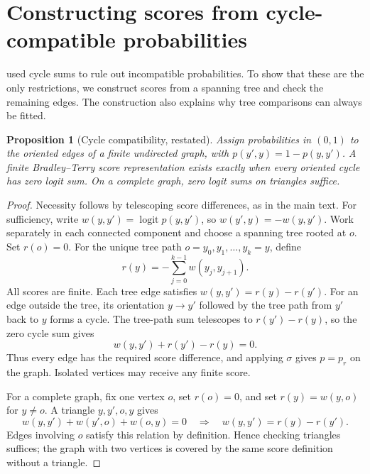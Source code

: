 \documentclass[11pt,twoside]{article}
\newtheorem{proposition}[theorem]{Proposition}
\theoremstyle{definition}
\theoremstyle{remark}
\begin{document}
\clearpage
\section{Constructing scores from cycle-compatible probabilities}
\label{app:cycles}

 used cycle sums to rule out incompatible probabilities.
To show that these are the only restrictions, we construct scores from a
spanning tree and check the remaining edges. The construction also explains
why tree comparisons can always be fitted.

\begin{proposition}[Cycle compatibility, restated]
Assign probabilities in $(0,1)$ to the oriented edges of a finite undirected
graph, with $p(y',y)=1-p(y,y')$. A finite Bradley--Terry score representation
exists exactly when every oriented cycle has zero logit sum. On a complete
graph, zero logit sums on triangles suffice.
\end{proposition}

\begin{proof}
Necessity follows by telescoping score differences, as in the main text.
For sufficiency, write $w(y,y')=\operatorname{logit}p(y,y')$, so
$w(y',y)=-w(y,y')$. Work separately in each connected component and choose
a spanning tree rooted at $o$. Set $r(o)=0$. For the unique tree path
$o=y_0,y_1,\ldots,y_k=y$, define
\[
 r(y)=-\sum_{j=0}^{k-1}w(y_j,y_{j+1}).
\]
All scores are finite. Each tree edge satisfies $w(y,y')=r(y)-r(y')$.
For an edge outside the tree, its orientation $y\to y'$ followed by the
tree path from $y'$ back to $y$ forms a cycle. The tree-path sum telescopes
to $r(y')-r(y)$, so the zero cycle sum gives
\[
 w(y,y')+r(y')-r(y)=0.
\]
Thus every edge has the required score difference, and applying $\sigma$
gives $p=p_r$ on the graph. Isolated vertices may receive any finite score.

For a complete graph, fix one vertex $o$, set $r(o)=0$, and set
$r(y)=w(y,o)$ for $y\ne o$. A triangle $y,y',o,y$ gives
\[
 w(y,y')+w(y',o)+w(o,y)=0
 \quad\Longrightarrow\quad w(y,y')=r(y)-r(y').
\]
Edges involving $o$ satisfy this relation by definition. Hence checking
triangles suffices; the graph with two vertices is covered by the same
score definition without a triangle.
\end{proof}
\end{document}
